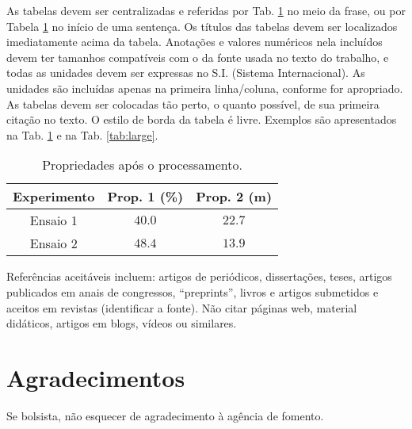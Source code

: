 \documentclass[
	article,			%
	10pt,				%
	oneside,			%
	a4paper,			%
  twocolumn,			%
	english,			%
	brazil,				%
	sumario=tradicional,
	]{abntex2}
\begin{document}
As tabelas devem ser centralizadas e referidas por Tab. \ref{tab:example} no meio da
frase, ou por Tabela \ref{tab:example} no início de uma sentença. Os títulos das tabelas
devem ser localizados imediatamente acima da tabela. Anotações e valores numéricos nela
incluídos devem ter tamanhos compatíveis com o da fonte usada no texto do trabalho, e
todas as unidades devem ser expressas no S.I. (Sistema Internacional). As unidades são
incluídas apenas na primeira linha/coluna, conforme for apropriado. As tabelas devem ser
colocadas tão perto, o quanto possível, de sua primeira citação no texto. O estilo de
borda da tabela é livre. Exemplos são apresentados na Tab. \ref{tab:example} e na Tab.
\ref{tab:large}.

\begin{table}[h]
  \caption{Propriedades após o processamento.}
  \label{tab:example}
  \centering
  \begin{tabular}{ccc}
    \toprule
    Experimento & Prop. 1 (\%) & Prop. 2 (m)\\
    \midrule
    Ensaio 1 & $40.0$ & $22.7$ \\
    Ensaio 2 & $48.4$ & $13.9$ \\
    \bottomrule
  \end{tabular}
\end{table}

Referências aceitáveis incluem: artigos de periódicos, dissertações, teses, artigos
publicados em anais de congressos, ``preprints'', livros e artigos submetidos e aceitos em
revistas (identificar a fonte). Não citar páginas web, material didáticos, artigos em
blogs, vídeos ou similares.

\section{Agradecimentos}

Se bolsista, não esquecer de agradecimento à agência de fomento.


\end{document}
